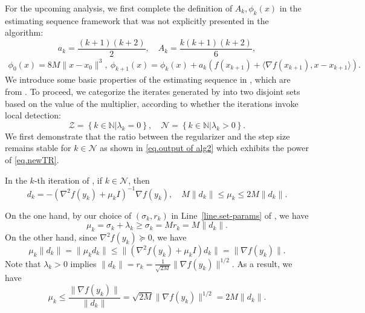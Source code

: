 \documentclass[moor,sglanonrev]{informs4}
\begin{document}
For the upcoming analysis, we first complete the definition of $A_k,\phi_k(x)$ in the estimating sequence framework that was not explicitly presented in the algorithm:
\begin{equation}
    \label{eq.update a and A}
    a_k = \frac{(k+1)(k+2)}{2}, \quad A_k=\frac{k(k+1)(k+2)}{6},
\end{equation}
\begin{align}\label{eq.update phi}
    \phi_0(x) = 8M\|x-x_0\|^3, \ \phi_{k+1}(x) =\phi_k(x)+a_k\left (f(x_{k+1})+\langle \nabla f(x_{k+1}),x-x_{k+1}\rangle \right ).
\end{align}
We introduce some basic properties of the estimating sequence in , which are from \citet{nesterov2018lectures}. To proceed, we categorize the iterates generated by  into two disjoint sets based on the value of the multiplier, according to whether the iterations invoke local detection:
\begin{equation}
    \label{eq.outer index catagory}
    \mathcal{Z} = \left \{k\in \mathbb{N} | \lambda_k=0\right\}, \quad \mathcal{N} = \left \{ k\in\mathbb{N} |  \lambda_k>0\right\}.
\end{equation}
We first demonstrate that the ratio between the regularizer and the step size remains stable for $k\in\mathcal{N}$ as shown in \eqref{eq.output of alg2} which exhibits the power of \ref{eq.newTR}.
\begin{lemma}
    \label{lem.ratio pass nonzero}
    In the $k$-th iteration of , if $k\in\mathcal{N}$, then
    \begin{equation}
        \label{eq.output of alg2}
        d_k = -(\nabla^2 f(y_k)+\mu_k I )^{-1}\nabla f(y_k), \quad
        M\|d_k\|\leq \mu_k \leq 2M\|d_k\|.
    \end{equation}
\end{lemma}
On the one hand, by our choice of $(\sigma_k,r_k)$ {\color{red} in Line~\ref{line.set-params} of }, we have $$\mu_k=\sigma_k+\lambda_k\geq\sigma_k= Mr_k= M\|d_k\|.$$
On the other hand, since $\nabla^2 f(y_k)\succeq 0$, we have
\begin{equation*}
    \mu_k\|d_k\|=\|\mu_kd_k\|\leq \|(\nabla^2 f(y_k)+\mu_k I)d_k\|=\|\nabla f(y_k)\|.
\end{equation*}
Note that $\lambda_k>0$ implies $\|d_k\|=r_k=\frac{1}{\sqrt{2M}}\|\nabla f(y_k)\|^{1/2}$. As a result, we have
\begin{equation*}
    \mu_k\leq \frac{\|\nabla f(y_k)\|}{\|d_k\|}=\sqrt{2M}\|\nabla f(y_k)\|^{1/2}=2M\|d_k\|.
\end{equation*}
\end{document}
